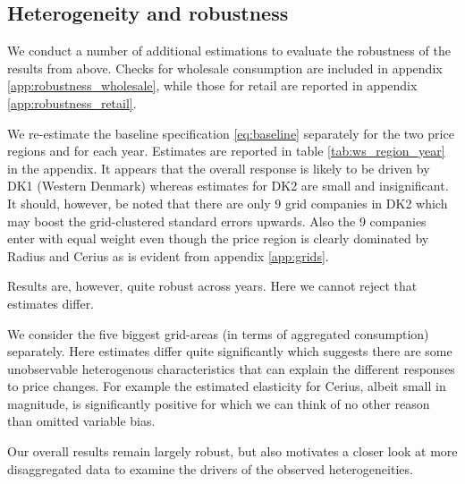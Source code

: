 \subsection{Heterogeneity and robustness}
\label{subsec:r_robustness}
\begin{comment}
Heterogeneous effects
\begin{figure}[H]
  \centering
  \caption{Wholesale elasticity by hour}
  \label{fig:ws_elasticity_hour}
\end{figure}

\begin{figure}[H]
  \centering
  \caption{Wholesale peak-elasticity by log grid size}
  \label{fig:ws_elasticity_grid}
\end{figure}
\end{comment}
We conduct a number of additional estimations to evaluate the robustness of the results from above. Checks for wholesale consumption are included in appendix \ref{app:robustness_wholesale}, while those for retail are reported in appendix \ref{app:robustness_retail}.
\par
We re-estimate the baseline specification \eqref{eq:baseline} separately for the two price regions and for each year. Estimates are reported in table \ref{tab:ws_region_year} in the appendix. It appears that the overall response is likely to be driven by DK1 (Western Denmark) whereas estimates for DK2 are small and insignificant. It should, however, be noted that there are only 9 grid companies in DK2 which may boost the grid-clustered standard errors upwards. Also the 9 companies enter with equal weight even though the price region is clearly dominated by Radius and Cerius as is evident from appendix \ref{app:grids}.
\par
Results are, however, quite robust across years. Here we cannot reject that estimates differ. \bigskip \par
We consider the five biggest grid-areas (in terms of aggregated consumption) separately. Here estimates differ quite significantly which suggests there are some unobservable heterogenous characteristics that can explain the different responses to price changes. For example the estimated elasticity for Cerius, albeit small in magnitude, is significantly positive for which we can think of no other reason than omitted variable bias. %

Our overall results remain largely robust, but also motivates a closer look at more disaggregated data to examine the drivers of the observed heterogeneities. 

